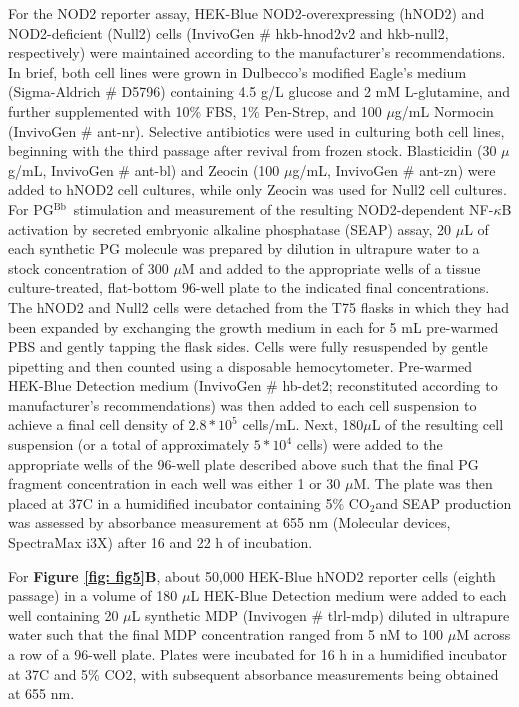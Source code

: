 \documentclass[twoside, watermark]{zHenriquesLab-StyleBioRxiv}
\newcommand{\tmu}{$\mu$} %
\newcommand{\COtwo}{CO$_\text{2}$} %
\newcommand{\pgbb}{PG$^\text{Bb}$}
\begin{document}
\vspace{1mm}
For the NOD2 reporter assay, HEK-Blue NOD2-overexpressing (hNOD2) and NOD2-deficient (Null2) cells (InvivoGen \# hkb-hnod2v2 and hkb-null2, respectively) were maintained according to the manufacturer’s recommendations. In brief, both cell lines were grown in Dulbecco's modified Eagle’s medium (Sigma-Aldrich \# D5796) containing 4.5 g/L glucose and 2 mM L-glutamine, and further supplemented with 10\% FBS, 1\% Pen-Strep, and 100 \tmu g/mL Normocin (InvivoGen \# ant-nr). Selective antibiotics were used in culturing both cell lines, beginning with the third passage after revival from frozen stock. Blasticidin (30 \tmu g/mL, InvivoGen \# ant-bl) and Zeocin (100 \tmu g/mL, InvivoGen \# ant-zn) were added to hNOD2 cell cultures, while only Zeocin was used for Null2 cell cultures. For \pgbb~stimulation and measurement of the resulting NOD2-dependent NF-$\kappa$B activation by secreted embryonic alkaline phosphatase (SEAP) assay, 20 \tmu L of each synthetic PG molecule was prepared by dilution in ultrapure water to a stock concentration of 300 \tmu M and added to the appropriate wells of a tissue culture-treated, flat-bottom 96-well plate to the indicated final concentrations. The hNOD2 and Null2 cells were detached from the T75 flasks in which they had been expanded by exchanging the growth medium in each for 5 mL pre-warmed PBS and gently tapping the flask sides. Cells were fully resuspended by gentle pipetting and then counted using a disposable hemocytometer. Pre-warmed HEK-Blue Detection medium (InvivoGen \# hb-det2; reconstituted according to manufacturer’s recommendations) was then added to each cell suspension to achieve a final cell density of $2.8 * 10^5$ cells/mL. Next, 180\tmu L of the resulting cell suspension (or a total of approximately $5 * 10^4$ cells) were added to the appropriate wells of the 96-well plate described above such that the final PG fragment concentration in each well was either 1 or 30 \tmu M. The plate was then placed at 37\degree C in a humidified incubator containing 5\% \COtwo and SEAP production was assessed by absorbance measurement at 655 nm (Molecular devices, SpectraMax i3X) after 16 and 22 h of incubation.

\vspace{1mm}
For \textbf{Figure \ref{fig: fig5}B}, about 50,000 HEK-Blue hNOD2 reporter cells (eighth passage) in a volume of 180 \tmu L HEK-Blue Detection medium were added to each well containing 20 \tmu L synthetic MDP (Invivogen \# tlrl-mdp) diluted in ultrapure water such that the final MDP concentration ranged from 5 nM to 100 \tmu M across a row of a 96-well plate. Plates were incubated for 16 h in a humidified incubator at 37\degree C and 5\% CO2, with subsequent absorbance measurements being obtained at 655 nm.
\end{document}

